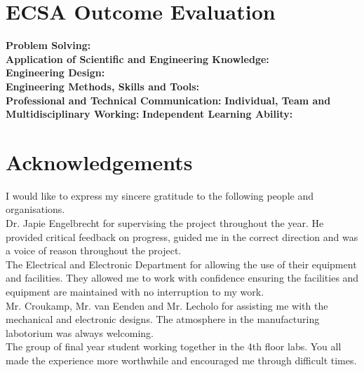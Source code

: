 \chapter{ECSA Outcome Evaluation}

\textbf{Problem Solving:}\\
\textbf{Application of Scientific and Engineering Knowledge:}\\
\textbf{Engineering Design:}\\
\textbf{Engineering Methods, Skills and Tools:}\\
\textbf{Professional and Technical Communication:}
\textbf{Individual, Team and Multidisciplinary Working:}
\textbf{Independent Learning Ability:}

\chapter{Acknowledgements}%

I would like to express my sincere gratitude to the following people
and organisations.\\

Dr. Japie Engelbrecht for supervising the project throughout the year. He provided critical feedback on progress, guided me in the correct direction and was a voice of reason throughout the project.\\

The Electrical and Electronic Department for allowing the use of their equipment and facilities. They allowed me to work with confidence ensuring the facilities and equipment are maintained with no interruption to my work.\\

Mr$.$ Croukamp, Mr$.$ van Eenden and Mr$.$ Lecholo for assisting me with the mechanical and electronic designs. The atmosphere in the manufacturing labotorium was always welcoming.\\

The group of final year student working together in the 4th floor labs. You all made the experience more worthwhile and encouraged me through  difficult times. 


\begin{comment}
\chapter{Dedications}%
\vfill
\begin{Afr}
\begin{center}\itshape
Hierdie verslag word opgedra aan my ouers wat my ondersteun het tydens die 4 jaar om die graad van ingenieurswese te ontvang en die Here vir sy genade. 
\end{center}
\end{Afr}
\vfill
\clearpage

\end{comment}

\endinput
